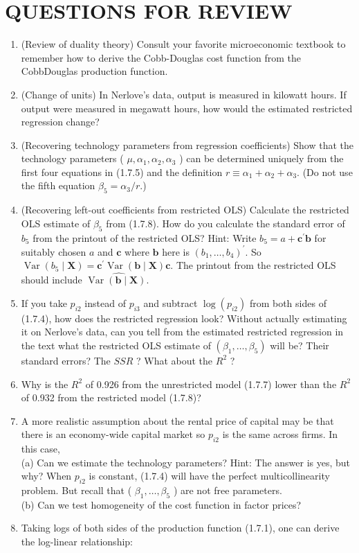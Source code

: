 \documentclass[10pt]{article}
\begin{document}
\section*{QUESTIONS FOR REVIEW}
\begin{enumerate}
  \item (Review of duality theory) Consult your favorite microeconomic textbook to remember how to derive the Cobb-Douglas cost function from the CobbDouglas production function.
  \item (Change of units) In Nerlove's data, output is measured in kilowatt hours. If output were measured in megawatt hours, how would the estimated restricted regression change?
  \item (Recovering technology parameters from regression coefficients) Show that the technology parameters ( $\mu, \alpha_{1}, \alpha_{2}, \alpha_{3}$ ) can be determined uniquely from the first four equations in (1.7.5) and the definition $r \equiv \alpha_{1}+\alpha_{2}+\alpha_{3}$. (Do not use the fifth equation $\beta_{5}=\alpha_{3} / r$.)
  \item (Recovering left-out coefficients from restricted OLS) Calculate the restricted OLS estimate of $\beta_{5}$ from (1.7.8). How do you calculate the standard error of $b_{5}$ from the printout of the restricted OLS? Hint: Write $b_{5}=a+\mathbf{c}^{\prime} \mathbf{b}$ for suitably chosen $a$ and $\mathbf{c}$ where $\mathbf{b}$ here is $\left(b_{1}, \ldots, b_{4}\right)^{\prime}$. So $\operatorname{Var}\left(b_{5} \mid \mathbf{X}\right)=\mathbf{c}^{\prime} \operatorname{Var}(\mathbf{b} \mid \mathbf{X}) \mathbf{c}$. The printout from the restricted OLS should include $\widehat{\operatorname{Var}(\mathbf{b} \mid \mathbf{X}) \text {. }}$
  \item If you take $p_{i 2}$ instead of $p_{i 3}$ and subtract $\log \left(p_{i 2}\right)$ from both sides of (1.7.4), how does the restricted regression look? Without actually estimating it on Nerlove's data, can you tell from the estimated restricted regression in the text what the restricted OLS estimate of $\left(\beta_{1}, \ldots, \beta_{5}\right)$ will be? Their standard errors? The $S S R$ ? What about the $R^{2}$ ?
  \item Why is the $R^{2}$ of 0.926 from the unrestricted model (1.7.7) lower than the $R^{2}$ of 0.932 from the restricted model (1.7.8)?
  \item A more realistic assumption about the rental price of capital may be that there is an economy-wide capital market so $p_{i 2}$ is the same across firms. In this case,\\
(a) Can we estimate the technology parameters? Hint: The answer is yes, but why? When $p_{i 2}$ is constant, (1.7.4) will have the perfect multicollinearity problem. But recall that ( $\beta_{1}, \ldots, \beta_{5}$ ) are not free parameters.\\
(b) Can we test homogeneity of the cost function in factor prices?
  \item Taking logs of both sides of the production function (1.7.1), one can derive the log-linear relationship:
\end{enumerate}
\end{document}
